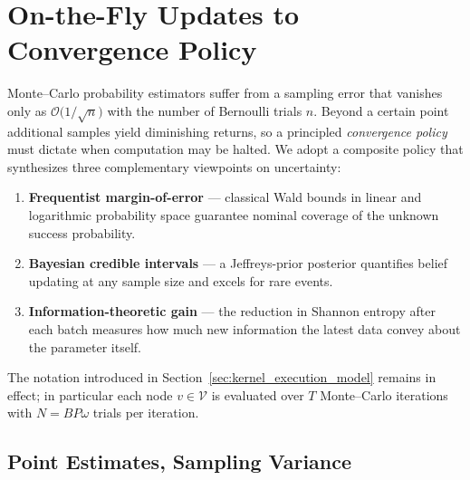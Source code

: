 \chapter{On-the-Fly Updates to Convergence Policy}
\label{sec:convergence_criterion}

Monte–Carlo probability estimators suffer from a sampling error that vanishes only as $\mathcal{O}\!\bigl(1/\sqrt{n}\bigr)$ with the number of Bernoulli trials $n$. Beyond a certain point additional samples yield diminishing returns, so a principled \emph{convergence policy} must dictate when computation may be halted. We adopt a composite policy that synthesizes three complementary viewpoints on uncertainty:

\begin{enumerate}
\item \textbf{Frequentist margin-of-error} — classical Wald bounds in linear and logarithmic probability space guarantee nominal coverage of the unknown success probability.
\item \textbf{Bayesian credible intervals} — a Jeffreys-prior posterior quantifies belief updating at any sample size and excels for rare events.
\item \textbf{Information-theoretic gain} — the reduction in Shannon entropy after each batch measures how much new information the latest data convey about the parameter itself.
\end{enumerate}

The notation introduced in Section~\ref{sec:kernel_execution_model} remains in effect; in particular each node $v\!\in\!\mathcal{V}$ is evaluated over $T$ Monte--Carlo iterations with
$N\!=\!B P \omega$ trials per iteration.

\section{Point Estimates, Sampling Variance}
\label{subsec:conv_point_estimates}

